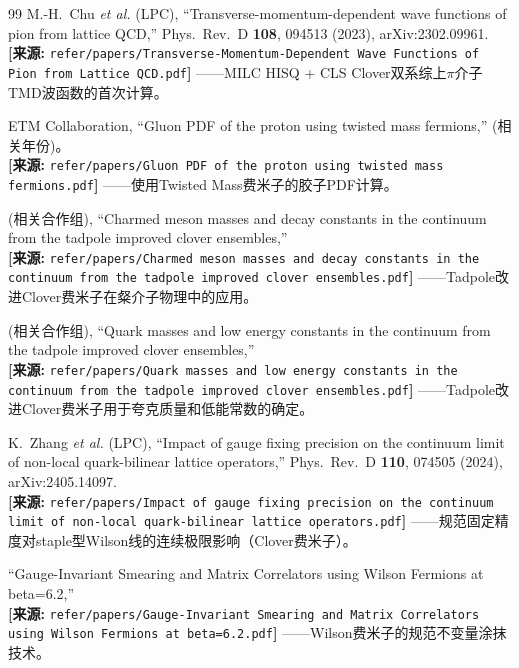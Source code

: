 \documentclass[12pt,a4paper]{ctexart}
\theoremstyle{definition}
\begin{document}
\begin{thebibliography}{99}
M.-H.~Chu \textit{et al.} (LPC),
``Transverse-momentum-dependent wave functions of pion from lattice QCD,''
Phys.\ Rev.\ D \textbf{108}, 094513 (2023), arXiv:2302.09961.
\\\textbf{[来源:} \texttt{refer/papers/Transverse-Momentum-Dependent Wave Functions of Pion from Lattice QCD.pdf}\textbf{]}
——MILC HISQ + CLS Clover双系综上$\pi$介子TMD波函数的首次计算。

ETM Collaboration,
``Gluon PDF of the proton using twisted mass fermions,''
(相关年份)。
\\\textbf{[来源:} \texttt{refer/papers/Gluon PDF of the proton using twisted mass fermions.pdf}\textbf{]}
——使用Twisted Mass费米子的胶子PDF计算。

(相关合作组),
``Charmed meson masses and decay constants in the continuum from the tadpole improved clover ensembles,''
\\\textbf{[来源:} \texttt{refer/papers/Charmed meson masses and decay constants in the continuum from the tadpole improved clover ensembles.pdf}\textbf{]}
——Tadpole改进Clover费米子在粲介子物理中的应用。

(相关合作组),
``Quark masses and low energy constants in the continuum from the tadpole improved clover ensembles,''
\\\textbf{[来源:} \texttt{refer/papers/Quark masses and low energy constants in the continuum from the tadpole improved clover ensembles.pdf}\textbf{]}
——Tadpole改进Clover费米子用于夸克质量和低能常数的确定。

K.~Zhang \textit{et al.} (LPC),
``Impact of gauge fixing precision on the continuum limit of non-local quark-bilinear lattice operators,''
Phys.\ Rev.\ D \textbf{110}, 074505 (2024), arXiv:2405.14097.
\\\textbf{[来源:} \texttt{refer/papers/Impact of gauge fixing precision on the continuum limit of non-local quark-bilinear lattice operators.pdf}\textbf{]}
——规范固定精度对staple型Wilson线的连续极限影响（Clover费米子）。

``Gauge-Invariant Smearing and Matrix Correlators using Wilson Fermions at beta=6.2,''
\\\textbf{[来源:} \texttt{refer/papers/Gauge-Invariant Smearing and Matrix Correlators using Wilson Fermions at beta=6.2.pdf}\textbf{]}
——Wilson费米子的规范不变量涂抹技术。

\end{thebibliography}
\end{document}
